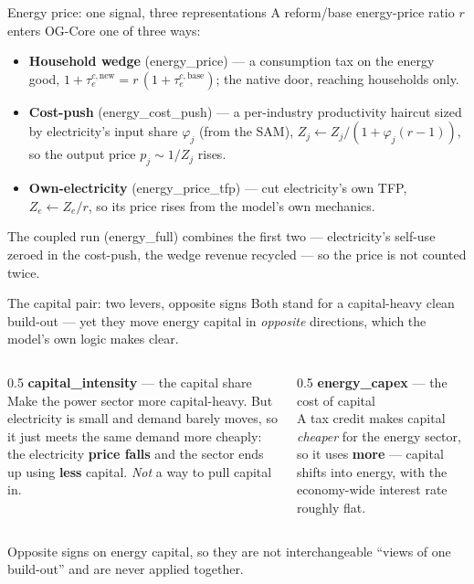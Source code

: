 \documentclass[aspectratio=169,11pt]{beamer}
\newcommand{\code}[1]{{\ttfamily\small #1}}
\begin{document}
\begin{frame}{Energy price: one signal, three representations}
  A reform/base energy-price ratio $r$ enters OG-Core one of three ways:
  \medskip
  \begin{itemize}\setlength\itemsep{9pt}\small
    \item \textbf{Household wedge} (\code{energy\_price}) --- a consumption tax on the energy good,
          $1+\tau^{c,\text{new}}_{e} = r\,(1+\tau^{c,\text{base}}_{e})$; the native door, reaching households only.
    \item \textbf{Cost-push} (\code{energy\_cost\_push}) --- a per-industry productivity haircut sized by
          electricity's input share $\varphi_j$ (from the SAM), $Z_j \leftarrow Z_j /(1+\varphi_j(r-1))$, so the
          output price $p_j \sim 1/Z_j$ rises.
    \item \textbf{Own-electricity} (\code{energy\_price\_tfp}) --- cut electricity's own TFP,
          $Z_e \leftarrow Z_e/r$, so its price rises from the model's own mechanics.
  \end{itemize}
  \vfill
  {\footnotesize\color{sub}The coupled run (\code{energy\_full}) combines the first two --- electricity's
  self-use zeroed in the cost-push, the wedge revenue recycled --- so the price is not counted twice.}
\end{frame}

\begin{frame}{The capital pair: two levers, opposite signs}
  Both stand for a capital-heavy clean build-out --- yet they move energy capital in \emph{opposite}
  directions, which the model's own logic makes clear.
  \medskip
  \begin{columns}[T]
    \begin{column}{0.5\textwidth}
      \textbf{\code{capital\_intensity}} --- the capital share\\[3pt]
      {\small Make the power sector more capital-heavy. But electricity is small and demand barely moves,
      so it just meets the same demand more cheaply: the electricity \textbf{\color{loss}price falls} and
      the sector ends up using \textbf{\color{loss}less} capital. \emph{Not} a way to pull capital in.}
    \end{column}
    \begin{column}{0.5\textwidth}
      \textbf{\code{energy\_capex}} --- the cost of capital\\[3pt]
      {\small A tax credit makes capital \emph{cheaper} for the energy sector, so it uses
      \textbf{\color{gain}more} --- capital shifts into energy, with the economy-wide interest rate
      roughly flat.}
    \end{column}
  \end{columns}
  \vfill
  {\footnotesize\color{sub}Opposite signs on energy capital, so they are not interchangeable ``views of one
  build-out'' and are never applied together.}
\end{frame}
\end{document}
